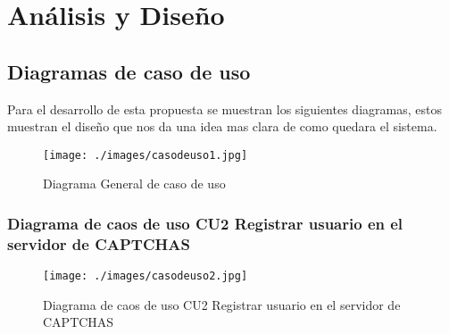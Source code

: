 \documentclass[12pt,oneside,onecolumn,openany]{report}
\begin{document}
\chapter{An\'alisis y Dise\~no} %
\section{Diagramas de caso de uso}
Para el desarrollo de esta propuesta se muestran los siguientes diagramas, estos muestran el diseño que nos da una idea mas clara de como quedara el sistema.
\begin{figure}[H]
	\texttt{[image: ./images/casodeuso1.jpg]}
	\caption{Diagrama General de caso de uso}
	\label{fig:4-2-1}
\end{figure}
\subsection{Diagrama de caos de uso CU2 Registrar usuario en el servidor de CAPTCHAS}
\begin{figure}[H]
	\texttt{[image: ./images/casodeuso2.jpg]}
	\caption{Diagrama de caos de uso CU2 Registrar usuario en el servidor de CAPTCHAS}
	\label{fig:4-3-1}
\end{figure}
\end{document}
